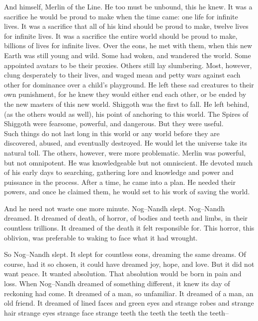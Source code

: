 And himself, Merlin of the Line. He too must be unbound, this he knew. It was a sacrifice he would be proud to make when the time came: one life for infinite lives. It was a sacrifice that all of his kind should be proud to make, twelve lives for infinite lives. It was a sacrifice the entire world should be proud to make, billions of lives for infinite lives.
\SmallVSpace
Over the eons, he met with them, when this new Earth was still young and wild. Some had woken, and wandered the world. Some appointed avatars to be their proxies. Others still lay slumbering. Most, however, clung desperately to their lives, and waged mean and petty wars against each other for dominance over a child’s playground. He left these sad creatures to their own punishment, for he knew they would either end each other, or be ended by the new masters of this new world.
\SmallVSpace
Shiggoth was the first to fall. He left behind, (as the others would as well), his point of anchoring to this world. The Spires of Shiggoth were fearsome, powerful, and dangerous. But they were useful.\\Such things do not last long in this world or any world before they are discovered, abused, and eventually destroyed. He would let the universe take its natural toll.
\SmallVSpace
The others, however, were more problematic. Merlin was powerful, but not omnipotent. He was knowledgeable but not omniscient. He devoted much of his early days to searching, gathering lore and knowledge and power and puissance in the process. After a time, he came into a plan. He needed their powers, and once he claimed them, he would set to his work of saving the world.

And he need not waste one more minute.
\doubleline
Nog\mbox{--}Nandh slept. Nog\mbox{--}Nandh dreamed. It dreamed of death, of horror, of bodies and teeth and limbs, in their countless trillions. It dreamed of the death it felt responsible for. This horror, this oblivion, was preferable to waking to face what it had wrought.

So Nog\mbox{--}Nandh slept. It slept for countless eons, dreaming the same dreams. Of course, had it so chosen, it could have dreamed joy, hope, and love. But it did not want peace. It wanted absolution. That absolution would be born in pain and loss.
\SmallVSpace
When Nog\mbox{--}Nandh dreamed of something different, it knew its day of reckoning had come. It dreamed of a man, so unfamiliar. It dreamed of a man, an old friend. It dreamed of lined faces and green eyes and strange robes and strange hair strange eyes strange face strange teeth the teeth the teeth the teeth\mbox{--}

